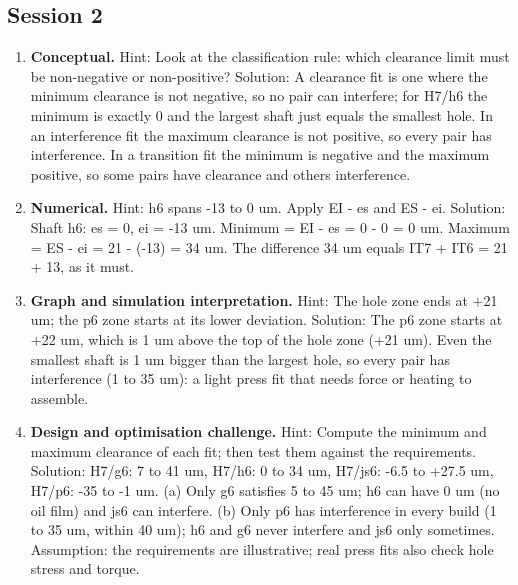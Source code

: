 \documentclass[11pt,a4paper]{article}
\begin{document}
\subsection*{Session 2}
\begin{enumerate}[nosep]
\item \textbf{Conceptual.} Hint: Look at the classification rule: which clearance limit must be non-negative or non-positive? Solution: A clearance fit is one where the minimum clearance is not negative, so no pair can interfere; for H7/h6 the minimum is exactly 0 and the largest shaft just equals the smallest hole. In an interference fit the maximum clearance is not positive, so every pair has interference. In a transition fit the minimum is negative and the maximum positive, so some pairs have clearance and others interference.
\item \textbf{Numerical.} Hint: h6 spans -13 to 0 um. Apply EI - es and ES - ei. Solution: Shaft h6: es = 0, ei = -13 um. Minimum = EI - es = 0 - 0 = 0 um. Maximum = ES - ei = 21 - (-13) = 34 um. The difference 34 um equals IT7 + IT6 = 21 + 13, as it must.
\item \textbf{Graph and simulation interpretation.} Hint: The hole zone ends at +21 um; the p6 zone starts at its lower deviation. Solution: The p6 zone starts at +22 um, which is 1 um above the top of the hole zone (+21 um). Even the smallest shaft is 1 um bigger than the largest hole, so every pair has interference (1 to 35 um): a light press fit that needs force or heating to assemble.
\item \textbf{Design and optimisation challenge.} Hint: Compute the minimum and maximum clearance of each fit; then test them against the requirements. Solution: H7/g6: 7 to 41 um, H7/h6: 0 to 34 um, H7/js6: -6.5 to +27.5 um, H7/p6: -35 to -1 um. (a) Only g6 satisfies 5 to 45 um; h6 can have 0 um (no oil film) and js6 can interfere. (b) Only p6 has interference in every build (1 to 35 um, within 40 um); h6 and g6 never interfere and js6 only sometimes. Assumption: the requirements are illustrative; real press fits also check hole stress and torque.
\end{enumerate}
\end{document}
